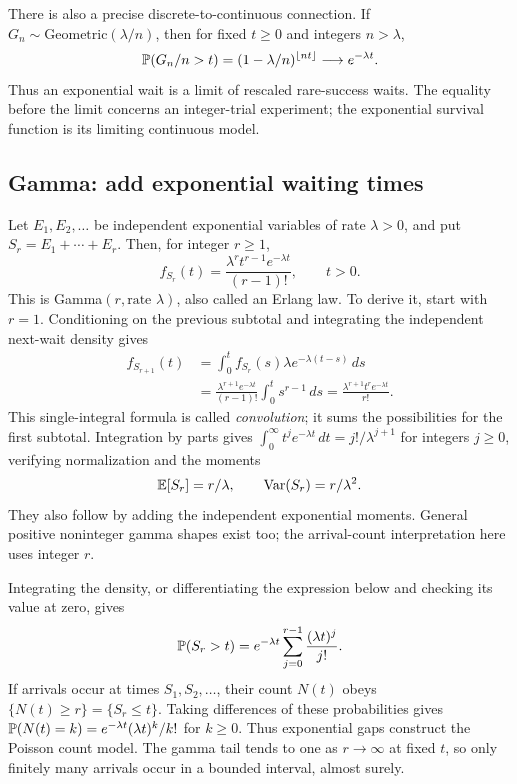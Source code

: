There is also a precise discrete-to-continuous connection. If
$G_n\sim\text{Geometric}(\lambda/n)$, then for fixed $t\ge0$ and
integers $n>\lambda$,
\[
\P(G_n/n>t)=(1-\lambda/n)^{\lfloor nt\rfloor}
\longrightarrow e^{-\lambda t}.
\]
Thus an exponential wait is a limit of rescaled rare-success waits.
The equality before the limit concerns an integer-trial experiment;
the exponential survival function is its limiting continuous model.

\subsection{Gamma: add exponential waiting times}
\label{sec:gamma-waits}

Let $E_1,E_2,\ldots$ be independent exponential variables of rate
$\lambda>0$, and put $S_r=E_1+\cdots+E_r$. Then, for integer $r\ge1$,
\[
\boxed{f_{S_r}(t)=\frac{\lambda^r t^{r-1}e^{-\lambda t}}{(r-1)!},
\qquad t>0.}
\]
This is Gamma$(r,\text{rate }\lambda)$, also called an Erlang law.
To derive it, start with $r=1$. Conditioning on the previous subtotal
and integrating the independent next-wait density gives
\begin{align*}
f_{S_{r+1}}(t)
&=\int_0^t f_{S_r}(s)\lambda e^{-\lambda(t-s)}\,ds\\
&=\frac{\lambda^{r+1}e^{-\lambda t}}{(r-1)!}
\int_0^t s^{r-1}\,ds
=\frac{\lambda^{r+1}t^re^{-\lambda t}}{r!}.
\end{align*}
This single-integral formula is called \emph{convolution}; it sums
the possibilities for the first subtotal. Integration by parts gives
$\int_0^\infty t^j e^{-\lambda t}\,dt=j!/\lambda^{j+1}$ for integers
$j\ge0$, verifying normalization and the moments
\[
\E[S_r]=r/\lambda,\qquad \Var(S_r)=r/\lambda^2.
\]
They also follow by adding the independent exponential moments.
General positive noninteger gamma shapes exist too; the arrival-count
interpretation here uses integer $r$.

Integrating the density, or differentiating the expression below and
checking its value at zero, gives
\[
\P(S_r>t)=e^{-\lambda t}\sum_{j=0}^{r-1}\frac{(\lambda t)^j}{j!}.
\]
If arrivals occur at times $S_1,S_2,\ldots$, their count $N(t)$ obeys
$\{N(t)\ge r\}=\{S_r\le t\}$. Taking differences of these probabilities
gives $\P(N(t)=k)=e^{-\lambda t}(\lambda t)^k/k!$ for $k\ge0$.
Thus exponential gaps construct the Poisson count model. The gamma
tail tends to one as $r\to\infty$ at fixed $t$, so only finitely many
arrivals occur in a bounded interval, almost surely.

